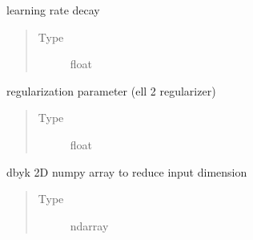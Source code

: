\documentclass[letterpaper,10pt,english]{sphinxmanual}
\begin{document}
\begin{fulllineitems}
\begin{fulllineitems}
\begin{quote}
\begin{description}
\end{description}\end{quote}

\end{fulllineitems}


\begin{fulllineitems}
\label{\detokenize{rom:rom.response_surfaces.NN_alt.lr_decay}}
\sphinxAtStartPar
learning rate decay
\begin{quote}\begin{description}
\item[{Type}] \leavevmode
\sphinxAtStartPar
float

\end{description}\end{quote}

\end{fulllineitems}


\begin{fulllineitems}
\label{\detokenize{rom:rom.response_surfaces.NN_alt.alpha}}
\sphinxAtStartPar
regularization parameter (ell 2 regularizer)
\begin{quote}\begin{description}
\item[{Type}] \leavevmode
\sphinxAtStartPar
float

\end{description}\end{quote}

\end{fulllineitems}


\begin{fulllineitems}
\label{\detokenize{rom:rom.response_surfaces.NN_alt.U}}
\sphinxAtStartPar
d\sphinxhyphen{}by\sphinxhyphen{}k 2D numpy array to reduce input dimension
\begin{quote}\begin{description}
\item[{Type}] \leavevmode
\sphinxAtStartPar
ndarray


\end{description}
\end{quote}
\end{fulllineitems}
\end{fulllineitems}
\end{document}
